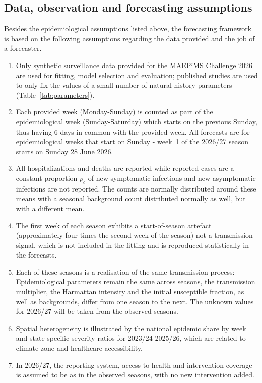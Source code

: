 \documentclass[12pt,a4paper]{article}
\theoremstyle{definition}
\theoremstyle{remark}
\begin{document}
\clearpage



\subsection{Data, observation and forecasting assumptions}\label{sec:data_assumptions}

Besides the epidemiological assumptions listed above, the forecasting framework is based on the following assumptions regarding the data provided and the job of a forecaster.
\begin{enumerate}[leftmargin=*,label=(D\arabic*)]
\item Only synthetic surveillance data provided for the MAEPiMS Challenge 2026 are used for fitting, model selection and evaluation; published studies are used to only fix the values of a small number of natural-history parameters (Table~\ref{tab:parameters}).
\item Each provided week (Monday-Sunday) is counted as part of the epidemiological week (Sunday-Saturday) which starts on the previous Sunday, thus having 6 days in common with the provided week. All forecasts are for epidemiological weeks that start on Sunday - week~1 of the 2026/27 season starts on Sunday 28 June 2026.
\item All hospitalizations and deaths are reported while reported cases are a constant proportion $p_c$ of new symptomatic infections and new asymptomatic infections are not reported. The counts are normally distributed around these means with a seasonal background count distributed normally as well, but with a different mean.
\item The first week of each season exhibits a start-of-season artefact (approximately four times the second week of the season) not a transmission signal, which is not included in the fitting and is reproduced statistically in the forecasts.
\item Each of these seasons is a realisation of the same transmission process: Epidemiological parameters remain the same across seasons, the transmission multiplier, the Harmattan intensity and the initial susceptible fraction, as well as backgrounds, differ from one season to the next. The unknown values for 2026/27 will be taken from the observed seasons.
\item Spatial heterogeneity is illustrated by the national epidemic share by week and state-specific severity ratios for 2023/24-2025/26, which are related to climate zone and healthcare accessibility.
\item In 2026/27, the reporting system, access to health and intervention coverage is assumed to be as in the observed seasons, with no new intervention added.
\end{enumerate}
\end{document}
